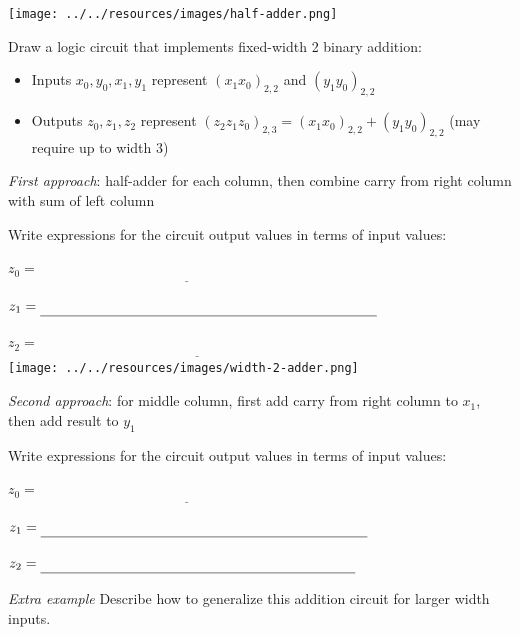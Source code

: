 \documentclass[12pt, oneside]{article}
\begin{document}
\begin{center}
\texttt{[image: ../../resources/images/half-adder.png]}
\end{center} \newpage


Draw a logic circuit that implements fixed-width 2 binary addition:
\begin{itemize}
\item Inputs  $x_0, y_0, x_1, y_1$ represent $(x_1  x_0)_{2,2}$ and $(y_1 y_0)_{2,2}$
\item Outputs  $z_0, z_1, z_2$ represent $(z_2  z_1 z_0)_{2,3} = (x_1  x_0)_{2,2} + (y_1 y_0)_{2,2}$ (may require up to width  $3$)
\end{itemize}

{\it First approach}: half-adder for each column, then combine carry from right column with sum of left column


Write expressions for the circuit output values in terms of input values:

$z_0 = \underline{\phantom{x_0 \oplus y_0\hspace{3in}}}$

$z_1 = \underline{\phantom{(x_1 \oplus y_1) \oplus c_0}\hspace{2.5in}}$ \phantom{where $c_0 = x_0 \land y_0$}

$z_2 = \underline{\phantom{(c_0 \land (x_1 \oplus y_1)) \oplus c_1}\hspace{2in}}$ \phantom{where $c_1 = x_1 \land y_1$}\\

\texttt{[image: ../../resources/images/width-2-adder.png]}



{\it Second approach}: for middle column, first add carry from right column to $x_1$, then add result to $y_1$


Write expressions for the circuit output values in terms of input values:

$z_0 = \underline{\phantom{x_0 \oplus y_0}\hspace{3in}}$

$z_1 = \underline{ \phantom{(c_0 \oplus x_1) \oplus y_1}\hspace{2.4in}}$ \phantom{where $c_0 = x_0 \land y_0$}

$z_2 = \underline{\phantom{(c_0 \land x_1) \oplus ((c_0 \oplus x_1)\land y_1)}\hspace{1.5in}}$

\vfill

{\it Extra example} Describe how to generalize this addition circuit for larger width inputs.
\end{document}
